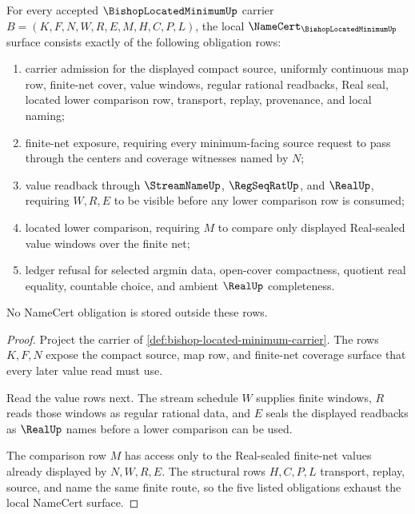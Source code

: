 \begin{theorem}
\label{thm:bishop-located-minimum-namecert-obligations}
For every accepted $\BishopLocatedMinimumUp$ carrier $B=(K,F,N,W,R,E,M,H,C,P,L)$, the local $\NameCert_{\BishopLocatedMinimumUp}$ surface consists exactly of the following obligation rows:
\begin{enumerate}
\item carrier admission for the displayed compact source, uniformly continuous map row, finite-net cover, value windows, regular rational readbacks, Real seal, located lower comparison row, transport, replay, provenance, and local naming;
\item finite-net exposure, requiring every minimum-facing source request to pass through the centers and coverage witnesses named by $N$;
\item value readback through $\StreamNameUp$, $\RegSeqRatUp$, and $\RealUp$, requiring $W,R,E$ to be visible before any lower comparison row is consumed;
\item located lower comparison, requiring $M$ to compare only displayed Real-sealed value windows over the finite net;
\item ledger refusal for selected argmin data, open-cover compactness, quotient real equality, countable choice, and ambient $\RealUp$ completeness.
\end{enumerate}
No NameCert obligation is stored outside these rows.
\end{theorem}
\begin{proof}
Project the carrier of \autoref{def:bishop-located-minimum-carrier}. The rows $K,F,N$ expose the compact source, map row, and finite-net coverage surface that every later value read must use.

Read the value rows next. The stream schedule $W$ supplies finite windows, $R$ reads those windows as regular rational data, and $E$ seals the displayed readbacks as $\RealUp$ names before a lower comparison can be used.

The comparison row $M$ has access only to the Real-sealed finite-net values already displayed by $N,W,R,E$. The structural rows $H,C,P,L$ transport, replay, source, and name the same finite route, so the five listed obligations exhaust the local NameCert surface.
\end{proof}

